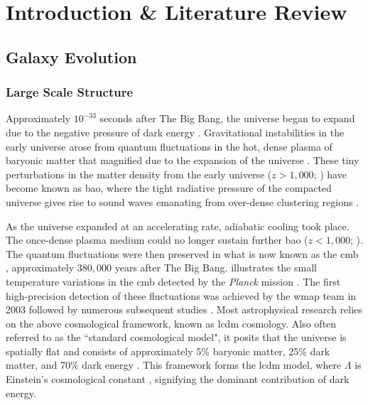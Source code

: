 \chapter{Introduction \& Literature Review}
\thispagestyle{empty}

\section{Galaxy Evolution}
\subsection{Large Scale Structure}
Approximately $10^{-33}$ seconds after The Big Bang, the universe began to expand due to the negative pressure of dark energy \citep{linde_new_1982, frieman_dark_2008, baumann_tasi_2009, desi_collaboration_desi_2024}. Gravitational instabilities in the early universe arose from quantum fluctuations in the hot, dense plasma of baryonic matter that magnified due to the expansion of the universe \citep{bond_how_1996, beutler_6df_2011, desi_collaboration_desi_2016}. These tiny perturbations in the matter density from the early universe ($z>1,000$; \citealp{beutler_6df_2011}) have become known as \gls{bao}, where the tight radiative pressure of the compacted universe gives rise to sound waves emanating from over-dense clustering regions \citep{eisenstein_baryonic_1998, eisenstein_detection_2005}.

As the universe expanded at an accelerating rate, adiabatic cooling took place. The once-dense plasma medium could no longer sustain further \gls{bao} ($z<1,000$; \citealp{eisenstein_detection_2005, baumann_tasi_2009}). The quantum fluctuations were then preserved in what is now known as the \gls{cmb} \citep{eisenstein_baryonic_1998, planck_collaboration_planck_2020-1}, approximately $380,000$ years after The Big Bang.  illustrates the small temperature variations in the \gls{cmb} detected by the \textit{Planck} mission \citep{planck_collaboration_planck_2020}. The first high-precision detection of these fluctuations was achieved by the \gls{wmap} team in 2003 \citep{spergel_first-year_2003} followed by numerous subsequent studies \citep{hinshaw_nine-year_2013}. Most astrophysical research relies on the above cosmological framework, known as \gls{lcdm} cosmology. Also often referred to as the ``standard cosmological model", it posits that the universe is spatially flat and consists of approximately 5\% baryonic matter, 25\% dark matter, and 70\% dark energy \citep{desi_collaboration_desi_2024}. This framework forms the \gls{lcdm} model, where $\Lambda$ is Einstein's cosmological constant \citep{einstein_kosmologische_1917}, signifying the dominant contribution of dark energy.

